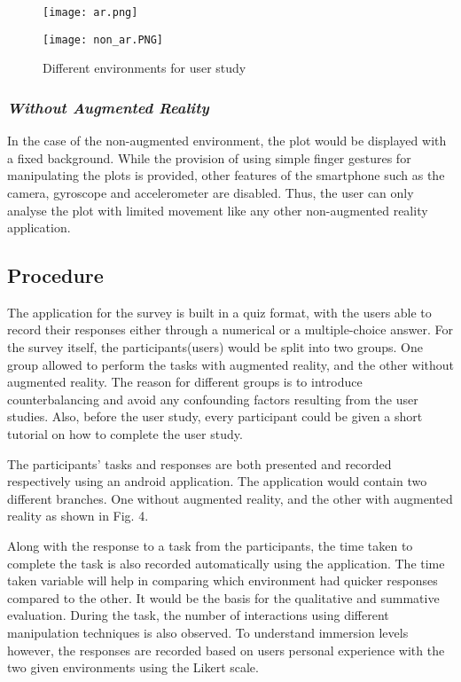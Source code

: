 \documentclass[journal]{vgtc}                %
\begin{document}
\begin{figure}[ht]
    \begin{minipage}[b]{0.45\linewidth}
        \centering
        \texttt{[image: ar.png]}
    \end{minipage}
    \hspace{0.5cm}
    \begin{minipage}[b]{0.45\linewidth}
        \centering
        \texttt{[image: non\_ar.PNG]}
    \end{minipage}
    \caption{Different environments for user study}
\end{figure}

\subsubsection{\textit{Without Augmented Reality}}
In the case of the non-augmented environment, the plot would be displayed with a fixed background. While the provision of using simple finger gestures for manipulating the plots is provided, other features of the smartphone such as the camera, gyroscope and accelerometer are disabled. Thus, the user can only analyse the plot with limited movement like any other non-augmented reality application.

\subsection{Procedure}

The application for the survey is built in a quiz format, with the users able to record their responses either through a numerical or a multiple-choice answer. For the survey itself, the participants(users) would be split into two groups. One group allowed to perform the tasks with augmented reality, and the other without augmented reality. The reason for different groups is to introduce counterbalancing and avoid any confounding factors resulting from the user studies. Also, before the user study, every participant could be given a short tutorial on how to complete the user study.

The participants' tasks and responses are both presented and recorded respectively using an android application. The application would contain two different branches. One without augmented reality, and the other with augmented reality as shown in Fig. 4.

Along with the response to a task from the participants, the time taken to complete the task is also recorded automatically using the application. The time taken variable will help in comparing which environment had quicker responses compared to the other. It would be the basis for the qualitative and summative evaluation\cite{Lewis}. During the task, the number of interactions using different manipulation techniques is also observed. To understand immersion levels however, the responses are recorded based on users personal experience with the two given environments using the Likert scale. 
\end{document}
